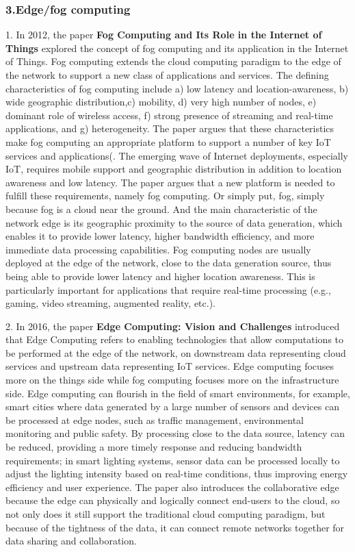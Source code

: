 \documentclass[a4paper,twoside]{scrbook}
\begin{document}
\begin{CJK}{UTF8}{gbsn}
\subsubsection{3.Edge/fog computing}
1. In 2012, the paper \textbf{Fog Computing and Its Role in the Internet of Things}\cite{bonomi2012fog} explored the concept of fog computing and its application in the Internet of Things. Fog computing extends the cloud computing paradigm to the edge of the network to support a new class of applications and services. The defining characteristics of fog computing include a) low latency and location-awareness, b) wide geographic distribution,c) mobility, d) very high number of nodes, e) dominant role of wireless access, f) strong presence of streaming and real-time applications, and g) heterogeneity. The paper argues that these characteristics make fog computing an appropriate platform to support a number of key IoT services and applications(. The emerging wave of Internet deployments, especially IoT, requires mobile support and geographic distribution in addition to location awareness and low latency. The paper argues that a new platform is needed to fulfill these requirements, namely fog computing. Or simply put, fog, simply because fog is a cloud near the ground. And the main characteristic of the network edge is its geographic proximity to the source of data generation, which enables it to provide lower latency, higher bandwidth efficiency, and more immediate data processing capabilities.
Fog computing nodes are usually deployed at the edge of the network, close to the data generation source, thus being able to provide lower latency and higher location awareness. This is particularly important for applications that require real-time processing (e.g., gaming, video streaming, augmented reality, etc.).


2. In 2016, the paper \textbf{Edge Computing: Vision and Challenges}\cite{shi2016edge} introduced that Edge Computing refers to enabling technologies that allow computations to be performed at the edge of the network, on downstream data representing cloud services and upstream data representing IoT services. Edge computing focuses more on the things side while fog computing focuses more on the infrastructure side. Edge computing can flourish in the field of smart environments, for example, smart cities where data generated by a large number of sensors and devices can be processed at edge nodes, such as traffic management, environmental monitoring and public safety. By processing close to the data source, latency can be reduced, providing a more timely response and reducing bandwidth requirements; in smart lighting systems, sensor data can be processed locally to adjust the lighting intensity based on real-time conditions, thus improving energy efficiency and user experience. The paper also introduces the collaborative edge because the edge can physically and logically connect end-users to the cloud, so not only does it still support the traditional cloud computing paradigm, but because of the tightness of the data, it can connect remote networks together for data sharing and collaboration.



\end{CJK}
\end{document}
